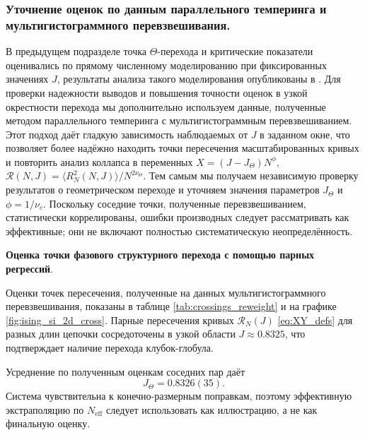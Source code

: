  
 \subsubsection{Уточнение оценок по данным параллельного темперинга и мультигистограммного перевзвешивания.}
 В предыдущем подразделе точка $\Theta$-перехода и критические показатели оценивались по прямому численному моделированию при фиксированных значениях $J$, результаты анализа такого моделирования опубликованы в \cite{faizullina2021critical1}.
 Для проверки надежности выводов и повышения точности оценок в узкой окрестности перехода мы дополнительно используем данные, полученные методом параллельного темперинга с мультигистограммным перевзвешиванием.
 Этот подход даёт гладкую зависимость наблюдаемых от $J$ в заданном окне, что позволяет более надёжно находить точки пересечения масштабированных кривых и  повторить анализ коллапса в переменных $X=(J-J_\Theta)N^\phi$, $ \mathcal{R}(N, J) =\langle R_N^2 (N,J) \rangle/N^{2\nu_\Theta}$.
 Тем самым мы получаем независимую проверку результатов о геометрическом переходе и уточняем значения параметров $J_\Theta$ и $\phi=1/\nu_c$.
 Поскольку соседние точки, полученные перевзвешиванием, статистически коррелированы,
 ошибки производных следует рассматривать как эффективные; они не включают полностью
 систематическую неопределённость.
 
 
 
    \textbf{Оценка точки фазового структурного перехода с помощью парных регрессий}. 
 
 Оценки точек пересечения, полученные на данных мультигистограммного перевзвешивания, показаны в таблице \ref{tab:crossings_reweight} и на графике \ref{fig:ising_si_2d_cross}. 
 Парные пересечения кривых $\mathcal{R}_N (J)$ \eqref{eq:XY_defs} для разных длин цепочки сосредоточены в узкой области
 $J \approx 0.8325$, что подтверждает наличие перехода клубок-глобула.
 
Усреднение по полученным оценкам соседних пар  даёт
 \[
 J_\Theta = 0.8326(35). 
 \]
 Система чувствительна к конечно-размерным
 поправкам, поэтому эффективную экстраполяцию по $N_{\mathrm{eff}}$ следует использовать
 как иллюстрацию, а не как финальную оценку.  
 
